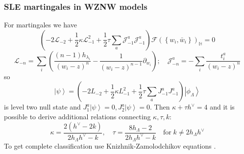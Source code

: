 \documentclass[pdftex]{beamer}
\newcommand{\gfh}{\hat{\mathfrak{g}}}
\theoremstyle{definition} \newtheorem{Def}{Definition}
\begin{document}
\begin{frame}
  \frametitle{SLE martingales in WZNW models}
   For martingales we have
  \begin{equation*}
    \left(-2 \mathcal{L}_{-2}+\frac{1}{2}\kappa \mathcal{L}_{-1}^{2}+\frac{1}{2}\tau\sum_{a} \mathcal{J}^{a}_{-1} \mathcal{J}^{a}_{-1}\right)        \mathcal{F}(\left\{w_{i}, \bar w_{i}\right\})_{\mathbb{H}}=0
  \end{equation*}
  \begin{equation*}
    \mathcal{L}_{-n}=\sum_{i}\left(\frac{(n-1)h_{\lambda_{i}}}{(w_{i}-z)^{n}}-\frac{1}{(w_{i}-z)^{n-1}}\partial_{w_{i}}\right);\quad \mathcal{J}^{a}_{{-n}}=-\sum_{i}\frac{t^{a}_{i}}{(w_{i}-z)^{n}}
  \end{equation*}
  so 
  \begin{equation*}
\left| \psi\right>=\left(-2 L_{-2}+\frac{1}{2}\kappa L_{-1}^{2}+\frac{1}{2}\tau\sum_{a} J^{a}_{-1} J^{a}_{-1}\right) \left|\phi_{\Lambda}\right>    
  \end{equation*}
 is level two null state and $J^{a}_{1} \left|\psi\right>=0, J^{a}_{2}\left|\psi\right>=0$. Then $\kappa+\tau h^{\vee}=4$ and it is possible to derive additional relations connecting $\kappa, \tau, k$:
 \begin{equation*}
   \kappa=\frac{2(h^{\vee}-2k)}{2h_{\Lambda}h^{\vee}-k},\quad \tau=\frac{8 h_{\Lambda}-2}{2h_{\Lambda}h^{\vee}-k}  \quad\text{for}\; k\neq 2h_{\Lambda}h^{\vee}
 \end{equation*}
 To get complete classification use Knizhnik-Zamolodchikov equations \cite{alekseev2010sle}.
\end{frame}
\end{document}
